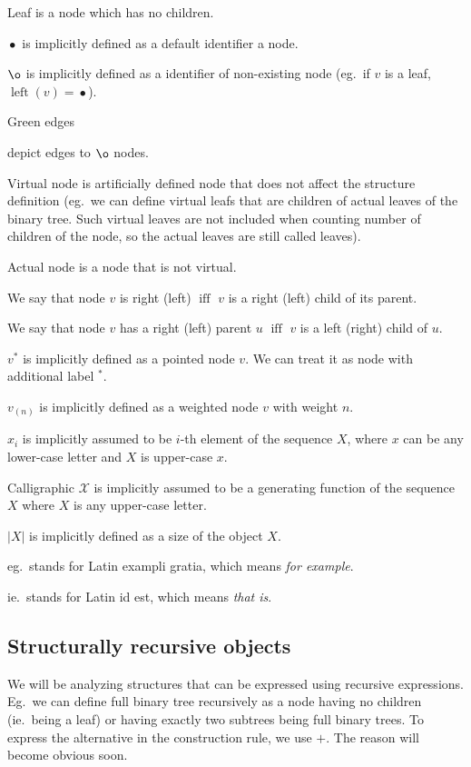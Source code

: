 \documentclass[final]{article}
\theoremstyle{definition}
\theoremstyle{remark}
\newcommand{\gf}[1]{\ensuremath{\mathcal{#1}}}
\newcommand{\pointed}[1]{\ensuremath{{#1}^*}}
\newcommand{\weighted}[1]{\ensuremath{_{(#1)}}}
\newcommand{\size}[1]{\ensuremath{\left|#1\right|}}
\DeclareMathOperator{\textiff}{\text{iff}}
\DeclareMathOperator{\tleft}{\text{left}}
\DeclareMathOperator{\n}{\bullet}
\DeclareMathOperator{\no}{\o}
\begin{document}
Leaf is a node which has no children.

\(\n\) is implicitly defined as a default identifier a node.

\(\no\) is implicitly defined as a identifier of non-existing node (eg.\ if \(v\) is a leaf, \(\tleft(v) = \n\)).

Green edges 
\begin{minipage}{1.5em}

\end{minipage}
depict edges to \(\no\) nodes.

Virtual node is artificially defined node that does not affect the structure definition (eg.\ we can define virtual leafs that are children of actual leaves of the binary tree. Such virtual leaves are not included when counting number of children of the node, so the actual leaves are still called leaves).

Actual node is a node that is not virtual.

We say that node \(v\) is right (left) \(\textiff\) \(v\) is a right (left) child of its parent.

We say that node \(v\) has a right (left) parent \(u\) \(\textiff\) \(v\) is a left (right) child of \(u\).

\(\pointed{v}\) is implicitly defined as a pointed node \(v\). We can treat it as node with additional label \(\pointed{}\).

\(v\weighted{n}\) is implicitly defined as a weighted node \(v\) with weight \(n\).

\(x_i\) is implicitly assumed to be \(i\)-th element of the sequence \(X\), where \(x\) can be any lower-case letter and \(X\) is upper-case \(x\).

Calligraphic \(\gf{X}\) is implicitly assumed to be a generating function of the sequence \(X\) where \(X\) is any upper-case letter.

\(\size{X}\) is implicitly defined as a size of the object \(X\).

eg.\ stands for Latin exampli gratia, which means \textit{for example}.

ie.\ stands for Latin id est, which means \textit{that is}.

\subsection{Structurally recursive objects}%
\label{sub:structurally_recursive_objects}

We will be analyzing structures that can be expressed using recursive expressions. Eg.\ we can define full binary tree recursively as a node having no children (ie.\ being a leaf) or having exactly two subtrees being full binary trees. To express the alternative in the construction rule, we use \(+\). The reason will become obvious soon.
\end{document}
